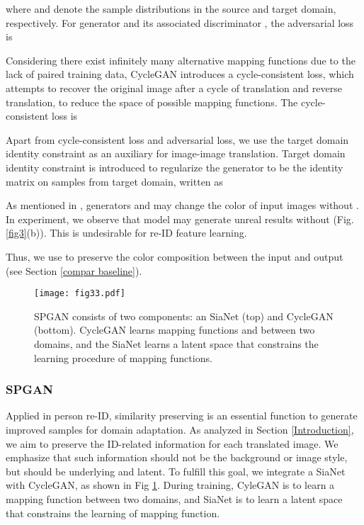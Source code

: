 \documentclass[10pt,twocolumn,letterpaper]{article}
\begin{document}
 where  and  denote the sample distributions in the source and target domain, respectively. For generator  and its associated discriminator , the adversarial loss is
  

Considering there exist infinitely many alternative mapping functions due to the lack of paired training data, CycleGAN introduces a cycle-consistent loss, which attempts to recover the original image after a cycle of translation and reverse translation, to reduce the space of possible mapping functions. The cycle-consistent loss is


Apart from cycle-consistent loss and adversarial loss, we use the target domain identity constraint \cite{DBLP:journals/corr/TaigmanPW16} as an auxiliary for image-image translation. Target domain identity constraint is introduced to regularize the generator to be the identity matrix on samples from target domain, written as

\label{eq:Identity}

As mentioned in \cite{cycle}, generators  and  may change the color of input images without . In experiment, we observe that model may generate unreal results without  (Fig. \ref{fig3}(b)). 
This is undesirable for re-ID feature learning. 

Thus, we use  to preserve the color composition between the input and output (see Section \ref{compar baseline}).
\begin{figure}[t]
\setlength{\abovecaptionskip}{0.2cm}
\setlength{\belowcaptionskip}{-0.5cm}
\begin{center}
\texttt{[image: fig33.pdf]}
\end{center}
\caption{SPGAN consists of two components: an  SiaNet (top) and CycleGAN (bottom). CycleGAN learns mapping functions  and  between two domains, and the SiaNet learns a latent space that constrains the learning procedure of mapping functions.}
\label{fig:SPGAN}
\end{figure}


\subsubsection{SPGAN}
Applied in person re-ID, similarity preserving is an essential function to generate improved samples for domain adaptation. As analyzed in Section \ref{Introduction}, we aim to preserve the ID-related information for each translated image. We emphasize that such information should not be the background or image style, but should be underlying and latent. 
To fulfill this goal, we integrate a SiaNet with CycleGAN, as shown in Fig \ref{fig:SPGAN}. During training, CyleGAN is to learn a mapping function between two domains, and SiaNet is to learn a latent space that constrains the learning of mapping function. 
\end{document}
